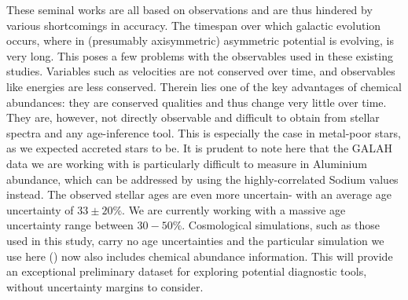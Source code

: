 \documentclass[fleqn,usenatbib]{mnras}
\begin{document}
These seminal works are all based on observations and are thus hindered by various shortcomings in accuracy. The timespan over which galactic evolution occurs, where in (presumably axisymmetric) asymmetric potential is evolving, is very long. This poses a few problems with the observables used in these existing studies. Variables such as velocities are not conserved over time, and observables like energies are less conserved. Therein lies one of the key advantages of chemical abundances: they are conserved qualities and thus change very little over time. They are, however, not directly observable and difficult to obtain from stellar spectra and any age-inference tool. This is especially the case in metal-poor stars, as we expected accreted stars to be. 
It is prudent to note here that the GALAH data we are working with is particularly difficult to measure in Aluminium abundance, which can be addressed by using the highly-correlated Sodium values instead. The observed stellar ages are even more uncertain- with an average age uncertainty of $33\pm20\%$. We are currently working with a massive age uncertainty range between $30-50\%$. Cosmological simulations, such as those used in this study, carry no age uncertainties and the particular simulation we use here (\citep{Buck2021}) now also includes chemical abundance information. This will provide an exceptional preliminary dataset for exploring potential diagnostic tools, without uncertainty margins to consider. 



\end{document}

